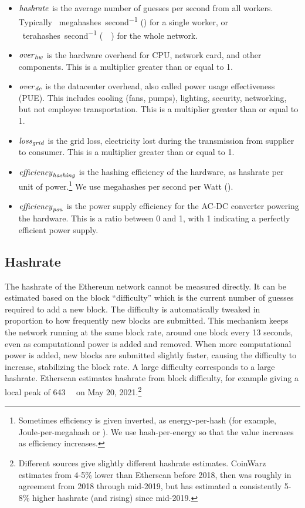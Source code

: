 \begin{itemize}
\item $\mathit{hashrate}$ is the average number of guesses per second from all workers. Typically \SI{}{megahashes\per{second}} (\hr{}) for a single worker, or \SI{}{terahashes\per{second}} (\SI{}{\tera\hps}) for the whole network.
\item $\mathit{over}_\mathit{hw}$ is the hardware overhead for CPU, network card, and other components. This is a multiplier greater than or equal to 1.
\item $\mathit{over}_\mathit{dc}$ is the datacenter overhead, also called power usage effectiveness (PUE). This includes cooling (fans, pumps), lighting, security, networking, but not employee transportation. This is a multiplier greater than or equal to 1.
\item $\mathit{loss}_\mathit{grid}$ is the grid loss, electricity lost during the transmission from supplier to consumer. This is a multiplier greater than or equal to 1.
\item $\mathit{efficiency}_\mathit{hashing}$ is the hashing efficiency of the hardware, as hashrate per unit of power.\footnote{Sometimes efficiency is given inverted, as energy-per-hash (for example, Joule-per-megahash or \effinv{}). We use hash-per-energy so that the value increases as efficiency increases.} We use megahashes per second per Watt (\eff{}).
\item $\mathit{efficiency}_\mathit{psu}$ is the power supply efficiency for the AC-DC converter powering the hardware. This is a ratio between 0 and 1, with 1 indicating a perfectly efficient power supply.
\end{itemize}

\subsection{Hashrate}

The hashrate of the Ethereum network cannot be measured directly. It can be estimated based on the block ``difficulty'' which is the current number of guesses required to add a new block. The difficulty is automatically tweaked in proportion to how frequently new blocks are submitted. This mechanism keeps the network running at the same block rate, around one block every 13 seconds, even as computational power is added and removed. When more computational power is added, new blocks are submitted slightly faster, causing the difficulty to increase, stabilizing the block rate. A large difficulty corresponds to a large hashrate. Etherscan\cite{etherscanio_ethereum_2021} estimates hashrate from block difficulty, for example giving a local peak of \SI{643}{\tera\hps} on May 20, 2021.\footnote{Different sources give slightly different hashrate estimates. CoinWarz\cite{coinwarz_ethereum_nodate} estimates from 4-5\% lower than Etherscan before 2018, then was roughly in agreement from 2018 through mid-2019, but has estimated a consistently 5-8\% higher hashrate (and rising) since mid-2019.}

